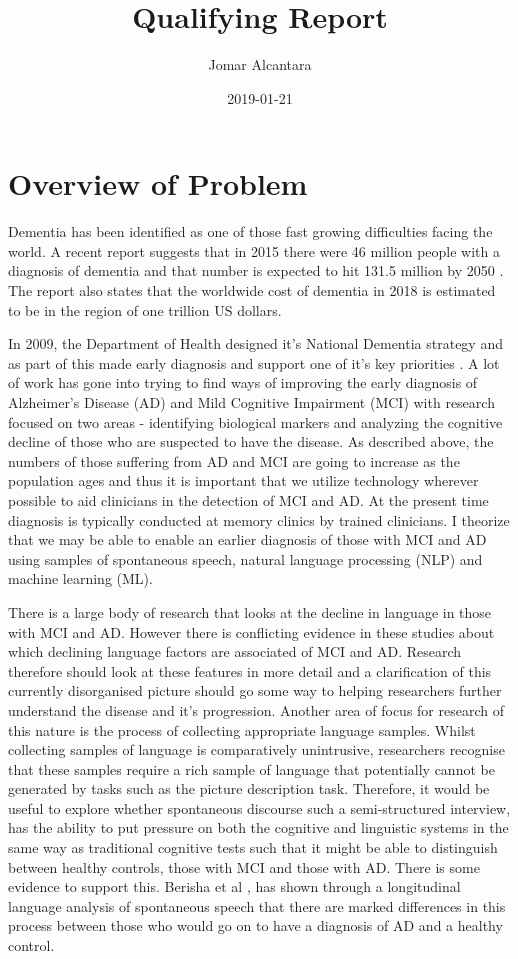 \documentclass[10pt, letterpaper, twoside, openany]{book}
\title{Qualifying Report}
\date{2019-01-21}
\author{Jomar Alcantara}
\begin{document}
\maketitle
\newpage
\tableofcontents
\listoftables
\listoffigures
\newpage
\chapter{Overview of Problem}
Dementia has been identified as one of those fast growing difficulties facing the world. A recent report suggests that in 2015 there were 46 million people with a diagnosis of dementia and that number is expected to hit 131.5 million by 2050 \cite{Prince2015}. The report also states that the worldwide cost of dementia in 2018 is estimated to be in the region of one trillion US dollars.
\par
In 2009, the Department of Health designed it's National Dementia strategy and as part of this made early diagnosis and support one of it's key priorities \cite{England2009}. A lot of work has gone into trying to find ways of improving the early diagnosis of Alzheimer's Disease (AD) and Mild Cognitive Impairment (MCI) with research focused on two areas - identifying biological markers and analyzing the cognitive decline of those who are suspected to have the disease\cite{Taler2008}. As described above, the numbers of those suffering from AD and MCI are going to increase as the population ages \cite{Prince2015} and thus it is important that we utilize technology wherever possible to aid clinicians in the detection of MCI and AD. At the present time diagnosis is typically conducted at memory clinics by trained clinicians\cite{Boschi2017}. I theorize that we may be able to enable an earlier diagnosis of those with MCI and AD using samples of spontaneous speech, natural language processing (NLP) and machine learning (ML).
\par
There is a large body of research that looks at the decline in language in those with MCI and AD\cite{Taler2008, Boschi2017}. However there is conflicting evidence in these studies about which declining language factors are associated of MCI and AD\cite{Taler2008, Boschi2017}. Research therefore should look at these features in more detail and a clarification of this currently disorganised picture should go some way to helping researchers further understand the disease and it's progression. Another area of focus for research of this nature is the process of collecting appropriate language samples. Whilst collecting samples of language is comparatively unintrusive, researchers recognise that these samples require a rich sample of language that potentially cannot be generated by tasks such as the picture description task. Therefore, it would be useful to explore whether spontaneous discourse such a semi-structured interview, has the ability to put pressure on both the cognitive and linguistic systems in the same way as traditional cognitive tests such that it might be able to distinguish between healthy controls, those with MCI and those with AD. There is some evidence to support this. Berisha et al \cite{Berisha2015}, has shown through a longitudinal language analysis of spontaneous speech that there are marked differences in this process between those who would go on to have a diagnosis of AD and a healthy control. 
\end{document}
